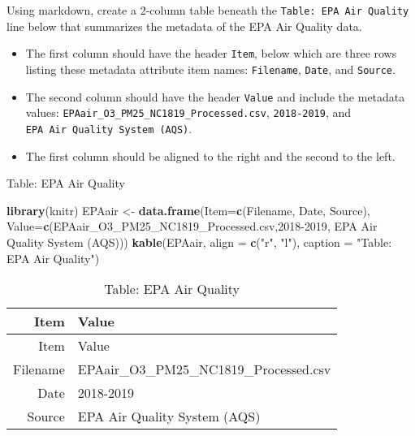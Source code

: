 \documentclass[
]{article}
\newenvironment{Shaded}{\begin{snugshade}}{\end{snugshade}}
\newcommand{\AttributeTok}[1]{\textcolor[rgb]{0.13,0.29,0.53}{#1}}
\newcommand{\FunctionTok}[1]{\textcolor[rgb]{0.13,0.29,0.53}{\textbf{#1}}}
\newcommand{\NormalTok}[1]{#1}
\newcommand{\OtherTok}[1]{\textcolor[rgb]{0.56,0.35,0.01}{#1}}
\newcommand{\StringTok}[1]{\textcolor[rgb]{0.31,0.60,0.02}{#1}}
\begin{document}
Using markdown, create a 2-column table beneath the
\texttt{Table:\ EPA\ Air\ Quality} line below that summarizes the
metadata of the EPA Air Quality data.

\begin{itemize}
\item
  The first column should have the header \texttt{Item}, below which are
  three rows listing these metadata attribute item names:
  \texttt{Filename}, \texttt{Date}, and \texttt{Source}.
\item
  The second column should have the header \texttt{Value} and include
  the metadata values: \texttt{EPAair\_O3\_PM25\_NC1819\_Processed.csv},
  \texttt{2018-2019}, and \texttt{EPA\ Air\ Quality\ System\ (AQS)}.
\item
  The first column should be aligned to the right and the second to the
  left.
\end{itemize}

Table: EPA Air Quality

\begin{Shaded}
\begin{Highlighting}[]
\FunctionTok{library}\NormalTok{(knitr)}
\NormalTok{EPAair }\OtherTok{\textless{}{-}} \FunctionTok{data.frame}\NormalTok{(}\AttributeTok{Item=}\FunctionTok{c}\NormalTok{(}\StringTok{\textquotesingle{}Filename\textquotesingle{}}\NormalTok{, }\StringTok{\textquotesingle{}Date\textquotesingle{}}\NormalTok{, }\StringTok{\textquotesingle{}Source\textquotesingle{}}\NormalTok{),}
                 \AttributeTok{Value=}\FunctionTok{c}\NormalTok{(}\StringTok{\textquotesingle{}EPAair\_O3\_PM25\_NC1819\_Processed.csv\textquotesingle{}}\NormalTok{,}\StringTok{\textquotesingle{}2018{-}2019\textquotesingle{}}\NormalTok{, }\StringTok{\textquotesingle{}EPA Air Quality System (AQS)\textquotesingle{}}\NormalTok{))}
\FunctionTok{kable}\NormalTok{(EPAair, }\AttributeTok{align =} \FunctionTok{c}\NormalTok{(}\StringTok{"r"}\NormalTok{, }\StringTok{"l"}\NormalTok{), }\AttributeTok{caption =} \StringTok{"Table: EPA Air Quality"}\NormalTok{)}
\end{Highlighting}
\end{Shaded}

\begin{longtable}[]{@{}rl@{}}
\caption{Table: EPA Air Quality}\tabularnewline
\toprule\noalign{}
Item & Value \\
\midrule\noalign{}
\endfirsthead
\toprule\noalign{}
Item & Value \\
\midrule\noalign{}
\endhead
\bottomrule\noalign{}
\endlastfoot
Filename & EPAair\_O3\_PM25\_NC1819\_Processed.csv \\
Date & 2018-2019 \\
Source & EPA Air Quality System (AQS) \\
\end{longtable}
\end{document}
